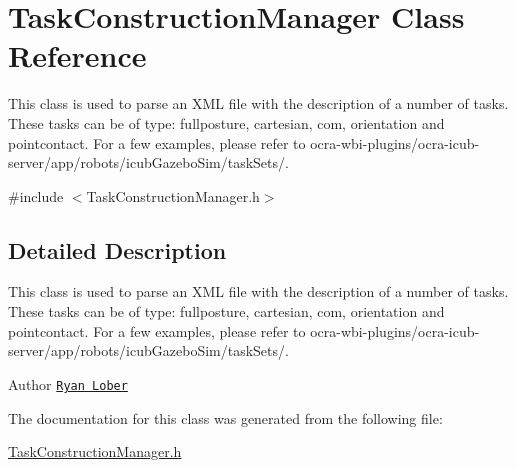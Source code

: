 \hypertarget{classTaskConstructionManager}{}\section{Task\+Construction\+Manager Class Reference}
\label{classTaskConstructionManager}


This class is used to parse an X\+ML file with the description of a number of tasks. These tasks can be of type\+: fullposture, cartesian, com, orientation and pointcontact. For a few examples, please refer to ocra-\/wbi-\/plugins/ocra-\/icub-\/server/app/robots/icub\+Gazebo\+Sim/task\+Sets/.  




{\ttfamily \#include $<$Task\+Construction\+Manager.\+h$>$}



\subsection{Detailed Description}
This class is used to parse an X\+ML file with the description of a number of tasks. These tasks can be of type\+: fullposture, cartesian, com, orientation and pointcontact. For a few examples, please refer to ocra-\/wbi-\/plugins/ocra-\/icub-\/server/app/robots/icub\+Gazebo\+Sim/task\+Sets/. 

\begin{DoxyAuthor}{Author}
\href{https://github.com/rlober}{\tt Ryan Lober} 
\end{DoxyAuthor}


The documentation for this class was generated from the following file\+:\begin{DoxyCompactItemize}
\item 
\hyperlink{TaskConstructionManager_8h}{Task\+Construction\+Manager.\+h}\end{DoxyCompactItemize}
